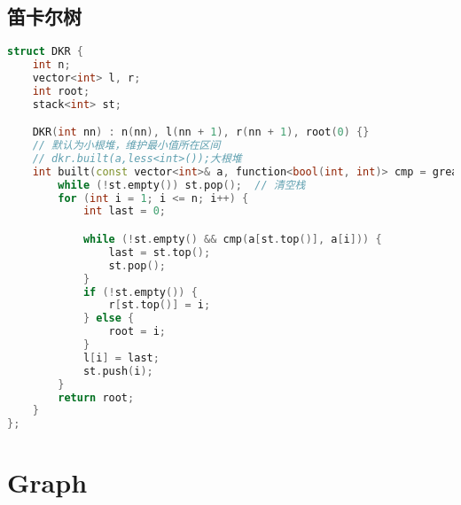 \subsection{笛卡尔树}
\begin{lstlisting}[language=C++]
struct DKR {
    int n;
    vector<int> l, r;
    int root;
    stack<int> st;

    DKR(int nn) : n(nn), l(nn + 1), r(nn + 1), root(0) {}
    // 默认为小根堆，维护最小值所在区间
    // dkr.built(a,less<int>());大根堆
    int built(const vector<int>& a, function<bool(int, int)> cmp = greater<int>()) {
        while (!st.empty()) st.pop();  // 清空栈
        for (int i = 1; i <= n; i++) {
            int last = 0;

            while (!st.empty() && cmp(a[st.top()], a[i])) {
                last = st.top();
                st.pop();
            }
            if (!st.empty()) {
                r[st.top()] = i;
            } else {
                root = i;
            }
            l[i] = last;
            st.push(i);
        }
        return root;
    }
};
\end{lstlisting}
\section{Graph}
